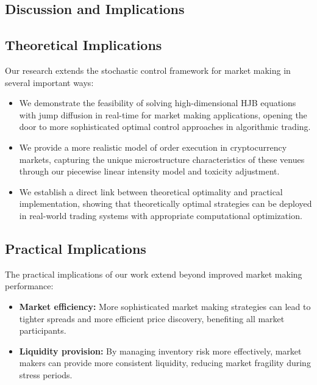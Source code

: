 \documentclass[onecolumn,ieee]{arithmaxresearch}
\begin{document}
\begin{twocolumn}
\section{Discussion and Implications}

\subsection{Theoretical Implications}

Our research extends the stochastic control framework for market making in several important ways:

\begin{itemize}
    \item We demonstrate the feasibility of solving high-dimensional HJB equations with jump diffusion in real-time for market making applications, opening the door to more sophisticated optimal control approaches in algorithmic trading.
    
    \item We provide a more realistic model of order execution in cryptocurrency markets, capturing the unique microstructure characteristics of these venues through our piecewise linear intensity model and toxicity adjustment.
    
    \item We establish a direct link between theoretical optimality and practical implementation, showing that theoretically optimal strategies can be deployed in real-world trading systems with appropriate computational optimization.
\end{itemize}

\subsection{Practical Implications}

The practical implications of our work extend beyond improved market making performance:

\begin{itemize}
    \item \textbf{Market efficiency:} More sophisticated market making strategies can lead to tighter spreads and more efficient price discovery, benefiting all market participants.
    
    \item \textbf{Liquidity provision:} By managing inventory risk more effectively, market makers can provide more consistent liquidity, reducing market fragility during stress periods.
    

\end{itemize}
\end{twocolumn}
\end{document}
